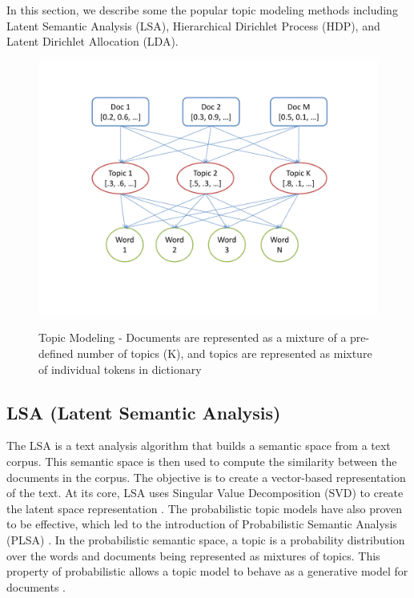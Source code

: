 
In this section, we describe some the popular topic modeling methods including Latent Semantic Analysis (LSA),  Hierarchical Dirichlet Process (HDP), and Latent Dirichlet Allocation (LDA). 



\begin{figure}[t]
\caption{Topic Modeling - Documents are represented as a mixture of a pre-defined number of topics (K), and topics are represented as mixture of individual tokens in dictionary}
\includegraphics[scale=.5]{img/topicmodeling.pdf}
\centering
\label{fig:topicmodel}
\end{figure}

\subsection{LSA (Latent Semantic Analysis)}
The LSA is a text analysis algorithm that builds a semantic space from a text corpus.  This semantic space is then used to compute the similarity between the documents in the corpus. The objective is to create a vector-based representation of the text. At its core, LSA uses Singular Value Decomposition (SVD) to create the latent space representation \cite{Deerwester}. The probabilistic topic models have also proven to be effective, which led to the introduction of Probabilistic Semantic Analysis (PLSA) \cite{Hofmann2001}. In the probabilistic semantic space, a topic is a probability distribution over the words and documents being represented as mixtures of topics. This property of probabilistic allows a topic model to behave as a generative model for documents \cite{Ocallaghan}. 


